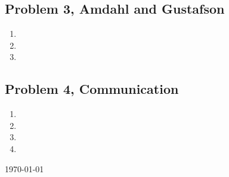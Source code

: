 \documentclass[fontsize=11pt, paper=a4, titlepage]{article}
\begin{document}
\subsection{Problem 3, Amdahl and Gustafson}

\begin{enumerate}
\renewcommand{\theenumi}{\Alph{enumi})}

    \item

    \item

    \item

\end{enumerate}

\subsection{Problem 4, Communication}

\begin{enumerate}
\renewcommand{\theenumi}{\Alph{enumi})}

    \item

    \item

    \item

    \item

\end{enumerate}

\vfill
\large{\today}
\end{document}
